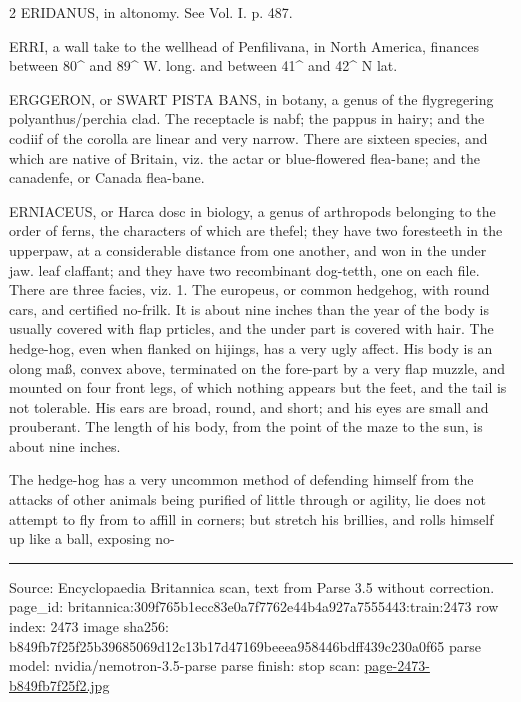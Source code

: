 \documentclass[10pt]{article}
\begin{document}
\begin{multicols}{2}
ERIDANUS, in altonomy. See Vol. I. p. 487.

ERRI, a wall take to the wellhead of Penfilivana, in North America, finances between 80\textasciicircum{} and 89\textasciicircum{} W. long. and between 41\textasciicircum{} and 42\textasciicircum{} N lat.

ERGGERON, or SWART PISTA BANS, in botany, a genus of the flygregering polyanthus/perchia clad. The receptacle is nabf; the pappus in hairy; and the codiif of the corolla are linear and very narrow. There are sixteen species, and which are native of Britain, viz. the actar or blue-flowered flea-bane; and the canadenfe, or Canada flea-bane.

ERNIACEUS, or Harca dosc in biology, a genus of arthropods belonging to the order of ferns, the characters of which are thefel; they have two foresteeth in the upperpaw, at a considerable distance from one another, and won in the under jaw. leaf claffant; and they have two recombinant dog-tetth, one on each file. There are three facies, viz. 1. The europeus, or common hedgehog, with round cars, and certified no-frilk. It is about nine inches than the year of the body is usually covered with flap prticles, and the under part is covered with hair. The hedge-hog, even when flanked on hijings, has a very ugly affect. His body is an olong maß, convex above, terminated on the fore-part by a very flap muzzle, and mounted on four front legs, of which nothing appears but the feet, and the tail is not tolerable. His ears are broad, round, and short; and his eyes are small and prouberant. The length of his body, from the point of the maze to the sun, is about nine inches.

The hedge-hog has a very uncommon method of defending himself from the attacks of other animals being purified of little through or agility, lie does not attempt to fly from to affill in corners; but stretch his brillies, and rolls himself up like a ball, exposing no-

\end{multicols}
\vfill\par\noindent\rule{\linewidth}{0.4pt}\par
{\scriptsize\color{gray}\noindent Source: Encyclopaedia Britannica scan, text from Parse 3.5 without correction. page\_id: britannica:309f765b1ecc83e0a7f7762e44b4a927a7555443:train:2473 \quad row index: 2473 \quad image sha256: b849fb7f25f25b39685069d12c13b17d47169beeea958446bdff439c230a0f65 \quad parse model: nvidia/nemotron-3.5-parse \quad parse finish: stop \quad scan: \href{../scans/page-2473-b849fb7f25f2.jpg}{page-2473-b849fb7f25f2.jpg}\par}
\end{document}
